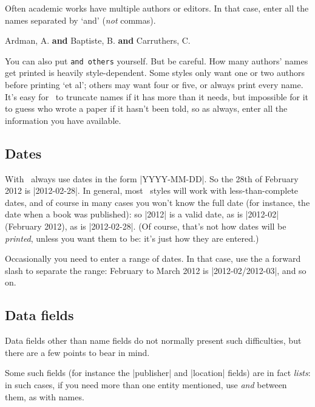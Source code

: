 Often academic works have multiple authors or editors. In that case,
enter all the names separated by `and' (\emph{not} commas).
\begin{center}
\ttfamily
Ardman, A. \textbf{and} Baptiste, B. \textbf{and} Carruthers, C.
\end{center}

You can also put \verb|and others| yourself. But be careful. How many
authors' names get printed is heavily style-dependent. Some styles only want one or two authors before
printing `et al'; others may want four or five, or always print every
name. It's easy for \biblatex\ to truncate names if it has more than
it needs, but impossible for it to guess who wrote a paper if it
hasn't been told, so as always, enter all the information you have
available.

\subsection{Dates}

With \biblatex\ always use dates in the form |YYYY-MM-DD|. So the 28th
of February 2012 is |2012-02-28|. In general, most \biblatex\ styles
will work with less-than-complete dates, and of course in many cases
you won't know the full date (for instance, the date when a book was
published): so |2012| is a valid date, as is |2012-02| (February
2012), as is |2012-02-28|. (Of course, that's not how dates will be
\emph{printed}, unless you want them to be: it's just how they are
entered.)

Occasionally you need to enter a range of dates. In that case, use the
a forward slash to separate the range: February to March 2012 is
|2012-02/2012-03|, and so on.

\subsection{Data fields}

Data fields other than name fields do not normally present such
difficulties, but there are a few points to bear in mind.

Some such fields (for instance the |publisher| and |location| fields)
are in fact \emph{lists}: in such cases, if you need more than one
entity mentioned, use \emph{and} between them, as with names.

